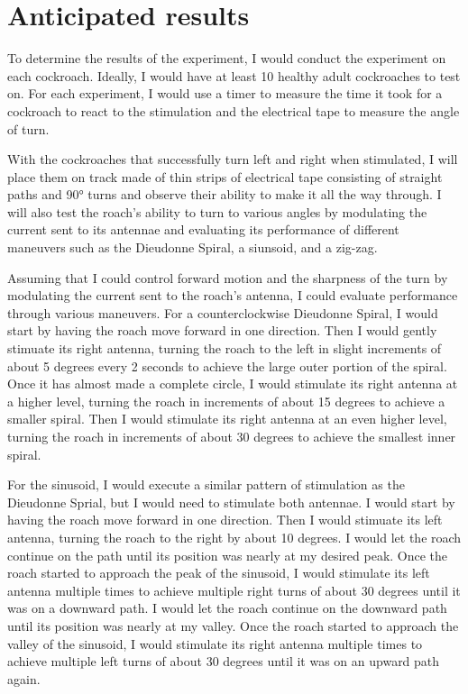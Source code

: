 \section{Anticipated results}





To determine the results of the experiment, I would conduct the experiment on each cockroach. Ideally, I would have at least 10 healthy adult cockroaches to test on. For each experiment, I would use a timer to measure the time it took for a cockroach to react to the stimulation and the electrical tape to measure the angle of turn. 


With the cockroaches that successfully turn left and right when stimulated, I will place them on track made of thin strips of electrical tape consisting of straight paths and \ang{90} turns and observe their ability to make it all the way through. I will also test the roach's ability to turn to various angles by modulating the current sent to its antennae and evaluating its performance of different maneuvers such as the Dieudonne Spiral, a siunsoid, and a zig-zag.

Assuming that I could control forward motion and the sharpness of the turn by modulating the current sent to the roach's antenna, I could evaluate performance through various maneuvers. For a counterclockwise Dieudonne Spiral, I would start by having the roach move forward in one direction. Then I would gently stimuate its right antenna, turning the roach to the left in slight increments of about 5 degrees every 2 seconds to achieve the large outer portion of the spiral. Once it has almost made a complete circle, I would stimulate its right antenna at a higher level, turning the roach in increments of about 15 degrees to achieve a smaller spiral. Then I would stimulate its right antenna at an even higher level, turning the roach in increments of about 30 degrees to achieve the smallest inner spiral.

For the sinusoid, I would execute a similar pattern of stimulation as the Dieudonne Sprial, but I would need to stimulate both antennae. I would start by having the roach move forward in one direction. Then I would stimuate its left antenna, turning the roach to the right by about 10 degrees. I would let the roach continue on the path until its position was nearly at my desired peak. Once the roach started to approach the peak of the sinusoid, I would stimulate its left antenna multiple times to achieve multiple right turns of about 30 degrees until it was on a downward path. I would let the roach continue on the downward path until its position was nearly at my valley. Once the roach started to approach the valley of the sinusoid, I would stimulate its right antenna multiple times to achieve multiple left turns of about 30 degrees until it was on an upward path again.

